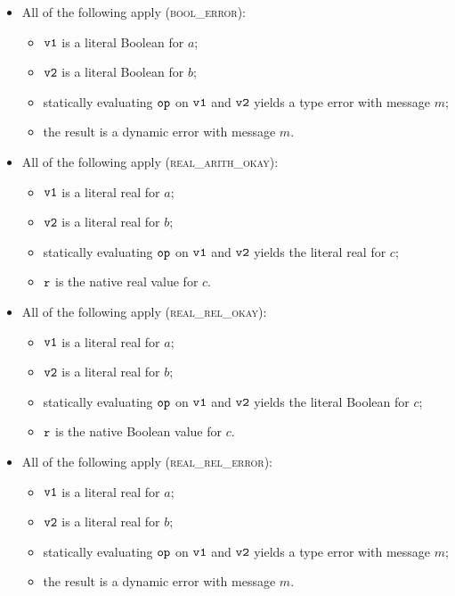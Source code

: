 \begin{itemize}
  \item All of the following apply (\textsc{bool\_error}):
  \begin{itemize}
    \item $\texttt{v1}$ is a literal Boolean for $a$;
    \item $\texttt{v2}$ is a literal Boolean for $b$;
    \item statically evaluating $\texttt{op}$ on $\texttt{v1}$ and $\texttt{v2}$ yields a type error with message $m$;
    \item the result is a dynamic error with message $m$.
  \end{itemize}

  \item All of the following apply (\textsc{real\_arith\_okay}):
  \begin{itemize}
    \item $\texttt{v1}$ is a literal real for $a$;
    \item $\texttt{v2}$ is a literal real for $b$;
    \item statically evaluating $\texttt{op}$ on $\texttt{v1}$ and $\texttt{v2}$ yields the literal real for $c$;
    \item $\texttt{r}$ is the native real value for $c$.
  \end{itemize}

  \item All of the following apply (\textsc{real\_rel\_okay}):
  \begin{itemize}
    \item $\texttt{v1}$ is a literal real for $a$;
    \item $\texttt{v2}$ is a literal real for $b$;
    \item statically evaluating $\texttt{op}$ on $\texttt{v1}$ and $\texttt{v2}$ yields the literal Boolean for $c$;
    \item $\texttt{r}$ is the native Boolean value for $c$.
  \end{itemize}

  \item All of the following apply (\textsc{real\_rel\_error}):
  \begin{itemize}
    \item $\texttt{v1}$ is a literal real for $a$;
    \item $\texttt{v2}$ is a literal real for $b$;
    \item statically evaluating $\texttt{op}$ on $\texttt{v1}$ and $\texttt{v2}$ yields a type error with message $m$;
    \item the result is a dynamic error with message $m$.
  \end{itemize}


\end{itemize}
